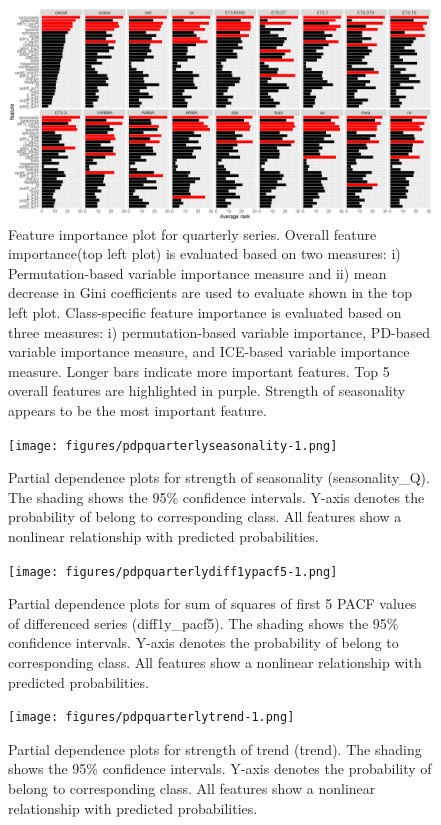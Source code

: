 \documentclass[11pt,a4paper,]{article}
\begin{document}
\begin{figure}
\centering
\includegraphics{figures/viquarterly-1.png}
\caption{\label{fig:viquarterly}Feature importance plot for quarterly
series. Overall feature importance(top left plot) is evaluated based on
two measures: i) Permutation-based variable importance measure and ii)
mean decrease in Gini coefficients are used to evaluate shown in the top
left plot. Class-specific feature importance is evaluated based on three
measures: i) permutation-based variable importance, PD-based variable
importance measure, and ICE-based variable importance measure. Longer
bars indicate more important features. Top 5 overall features are
highlighted in purple. Strength of seasonality appears to be the most
important feature.}
\end{figure}

\begin{figure}
\centering
\texttt{[image: figures/pdpquarterlyseasonality-1.png]}
\caption{\label{fig:pdpquarterlyseasonality}Partial dependence plots for
strength of seasonality (seasonality\_Q). The shading shows the 95\%
confidence intervals. Y-axis denotes the probability of belong to
corresponding class. All features show a nonlinear relationship with
predicted probabilities.}
\end{figure}

\begin{figure}
\centering
\texttt{[image: figures/pdpquarterlydiff1ypacf5-1.png]}
\caption{\label{fig:pdpquarterlydiff1ypacf5}Partial dependence plots for sum
of squares of first 5 PACF values of differenced series (diff1y\_pacf5).
The shading shows the 95\% confidence intervals. Y-axis denotes the
probability of belong to corresponding class. All features show a
nonlinear relationship with predicted probabilities.}
\end{figure}

\begin{figure}
\centering
\texttt{[image: figures/pdpquarterlytrend-1.png]}
\caption{\label{fig:pdpquarterlytrend}Partial dependence plots for strength
of trend (trend). The shading shows the 95\% confidence intervals.
Y-axis denotes the probability of belong to corresponding class. All
features show a nonlinear relationship with predicted probabilities.}
\end{figure}
\end{document}
